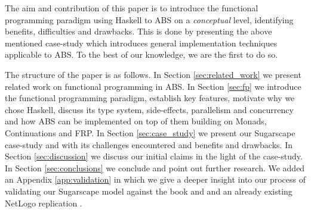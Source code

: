 The aim and contribution of this paper is to introduce the functional programming paradigm using Haskell to ABS on a \textit{conceptual} level, identifying benefits, difficulties and drawbacks. This is done by presenting the above mentioned case-study which introduces general implementation techniques applicable to ABS. To the best of our knowledge, we are the first to do so.

The structure of the paper is as follows. 
In Section \ref{sec:related_work} we present related work on functional programming in ABS. 
In Section \ref{sec:fp} we introduce the functional programming paradigm, establish key features, motivate why we chose Haskell, discuss its type system, side-effects, parallelism and concurrency and how ABS can be implemented on top of them building on Monads, Continuations and FRP. 
In Section \ref{sec:case_study} we present our Sugarscape case-study and with its challenges encountered and benefits and drawbacks.
In Section \ref{sec:discussion} we discuss our initial claims in the light of the case-study.
In Section \ref{sec:conclusions} we conclude and point out further research.
We added an Appendix \ref{app:validation} in which we give a deeper insight into our process of validating our Sugarscape model against the book and \cite{epstein_growing_1996} and an already existing NetLogo replication \cite{weaver_replicating_nodate}.